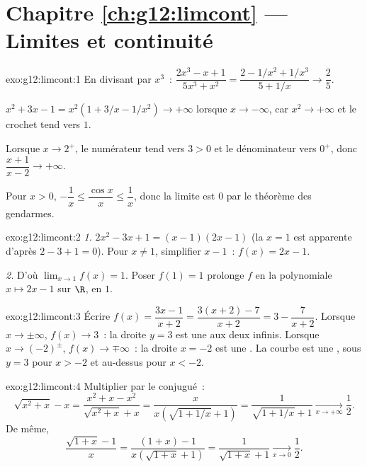 \section*{Chapitre \ref{ch:g12:limcont} --- Limites et continuité}

\begin{solution}{exo:g12:limcont:1}
En divisant par $x^3$~:
$\dfrac{2x^3 - x + 1}{5x^3 + x^2} = \dfrac{2 - 1/x^2 + 1/x^3}{5 + 1/x}
\to \dfrac{2}{5}$.

$x^2 + 3x - 1 = x^2(1 + 3/x - 1/x^2) \to +\infty$ lorsque
$x \to -\infty$, car $x^2 \to +\infty$ et le crochet tend vers $1$.

Lorsque $x \to 2^+$, le numérateur tend vers $3 > 0$ et le dénominateur
vers $0^+$, donc $\dfrac{x+1}{x-2} \to +\infty$.

Pour $x > 0$, $-\dfrac1x \leq \dfrac{\cos x}{x} \leq \dfrac1x$, donc la
limite est $0$ par le théorème des gendarmes.
\end{solution}

\begin{solution}{exo:g12:limcont:2}
\emph{1.} $2x^2 - 3x + 1 = (x-1)(2x-1)$ (la  $x=1$ est apparente
d'après $2 - 3 + 1 = 0$). Pour $x \neq 1$, simplifier $x - 1$~:
$f(x) = 2x - 1$.

\emph{2.} D'où $\lim_{x\to1} f(x) = 1$. Poser $f(1) = 1$ prolonge $f$ en
la  polynomiale $x \mapsto 2x-1$ sur $\R$,  en $1$.
\end{solution}

\begin{solution}{exo:g12:limcont:3}
Écrire $f(x) = \dfrac{3x - 1}{x + 2} = \dfrac{3(x+2) - 7}{x+2}
= 3 - \dfrac{7}{x+2}$. Lorsque $x \to \pm\infty$, $f(x) \to 3$~: la
droite $y = 3$ est une  aux deux infinis. Lorsque
$x \to (-2)^\pm$, $f(x) \to \mp\infty$~: la droite $x = -2$ est une
. La courbe est une , sous $y=3$ pour
$x > -2$ et au-dessus pour $x < -2$.
\end{solution}

\begin{solution}{exo:g12:limcont:4}
Multiplier par le conjugué~:
\[
\sqrt{x^2 + x} - x = \frac{x^2 + x - x^2}{\sqrt{x^2+x} + x}
= \frac{x}{x\left(\sqrt{1 + 1/x} + 1\right)}
= \frac{1}{\sqrt{1 + 1/x} + 1}
\xrightarrow[x\to+\infty]{} \frac{1}{2}.
\]
De même,
\[
\frac{\sqrt{1+x} - 1}{x} = \frac{(1+x) - 1}{x\left(\sqrt{1+x} + 1\right)}
= \frac{1}{\sqrt{1+x} + 1} \xrightarrow[x\to0]{} \frac{1}{2}.
\]
\end{solution}


